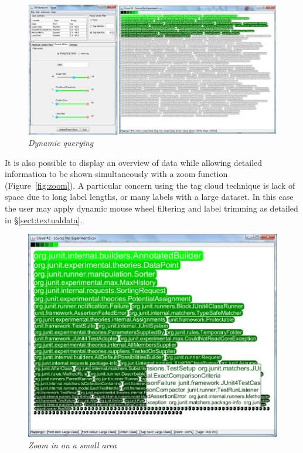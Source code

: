 \begin{figure}[!htb]
  	\centering
   	\includegraphics[scale=0.30]{dynamicfilter.png}
  	\caption{\textit{Dynamic querying}}
	\label{fig:taggledynamicfilter}
\end{figure}

It is also possible to display an overview of data while allowing detailed information to be shown simultaneously with a zoom function (Figure~\vref{fig:zoom}). A particular concern using the tag cloud technique is lack of space due to long label lengths, or many labels with a large dataset. In this case the user may apply dynamic mouse wheel filtering and label trimming as detailed in \S\ref{sect:textualdata}.

\begin{figure}[!htb]
  	\centering
   	\includegraphics[scale=0.40]{zoom.png}
  	\caption{\textit{Zoom in on a small area}}
	\label{fig:zoom}
\end{figure}

